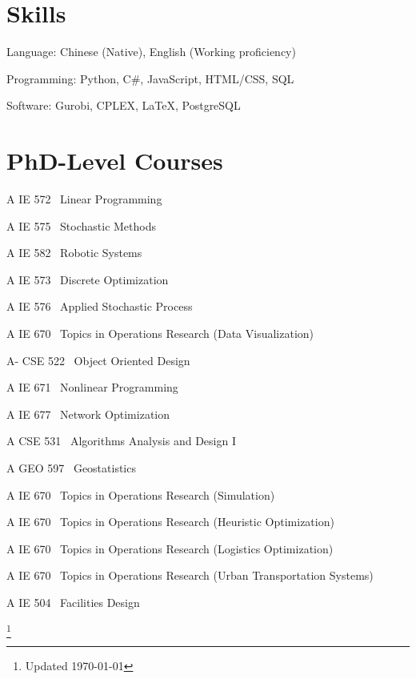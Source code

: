 \documentclass[12pt,letterpaper]{report}
\newcommand{\listitemspace}{0.25em}
\renewenvironment{itemize}
{\begin{list}{}{\setlength{\leftmargin}{0em}
                \setlength{\parskip}{0em}
                \setlength{\itemsep}{\listitemspace}
                \setlength{\parsep}{\listitemspace}}}
{\end{list}}
\begin{document}
    \section*{Skills}
    \begin{itemize}
        \item Language: Chinese (Native), English (Working proficiency)
        \item Programming: Python, C\#, JavaScript, HTML/CSS, SQL
        \item Software: Gurobi, CPLEX, LaTeX, PostgreSQL
    \end{itemize}

    \section*{PhD-Level Courses}
    \begin{tablist}
        \item[A] \tab{}IE 572 \ Linear Programming
        \item[A] \tab{}IE 575 \ Stochastic Methods
        \item[A] \tab{}IE 582 \ Robotic Systems
        \item[A] \tab{}IE 573 \ Discrete Optimization
        \item[A] \tab{}IE 576 \ Applied Stochastic Process
        \item[A] \tab{}IE 670 \ Topics in Operations Research (Data Visualization)
        \item[A-]\tab{}CSE 522 \ Object Oriented Design
        \item[A] \tab{}IE 671 \ Nonlinear Programming
        \item[A] \tab{}IE 677 \ Network Optimization
        \item[A] \tab{}CSE 531 \ Algorithms Analysis and Design I
        \item[A] \tab{}GEO 597 \ Geostatistics
        \item[A] \tab{}IE 670 \ Topics in Operations Research (Simulation)
        \item[A] \tab{}IE 670 \ Topics in Operations Research (Heuristic Optimization)
        \item[A] \tab{}IE 670 \ Topics in Operations Research (Logistics Optimization)
        \item[A] \tab{}IE 670 \ Topics in Operations Research (Urban Transportation Systems)
        \item[A] \tab{}IE 504 \ Facilities Design
    \end{tablist}

    \let\thefootnote\relax\footnote{Updated \monthyeardate\today}
\end{document}
